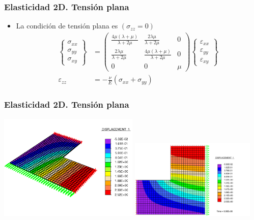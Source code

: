 \documentclass{beamer}
\begin{document}
\begin{frame}
\frametitle{Elasticidad 2D. Tensión plana}
\begin{itemize}
\item La condición de tensión plana es  $(\sigma_{zz}=0)$
\begin{align}
\left\{
\begin{array}{c}
\sigma_{xx} \\
\sigma_{yy} \\
\sigma_{xy}
\end{array}
\right\}&=
\left(
\begin{array}{ccc}
\frac{4\mu(\lambda+\mu)}{\lambda+2\mu} & \frac{2\lambda\mu}{\lambda+2\mu} & 0 \\
\frac{2\lambda\mu}{\lambda+2\mu} &\frac{4\mu(\lambda+\mu)}{\lambda+2\mu} &  0 \\
0           & 0       & \mu
\end{array}
\right)
\left\{
\begin{array}{c}
\varepsilon_{xx} \\
\varepsilon_{yy} \\
\varepsilon_{xy}
\end{array}
\right\} \\
\varepsilon_{zz}&=-\frac{\nu}{E} (\sigma_{xx}+\sigma_{yy})
\end{align}
\end{itemize}
\end{frame}
\begin{frame}
\frametitle{Elasticidad 2D. Tensión plana}
\begin{center}
\includegraphics[width=0.50\textwidth]{L3D}
\hfill
\includegraphics[width=0.45\textwidth]{L2D}
\end{center}
\end{frame}
\end{document}
